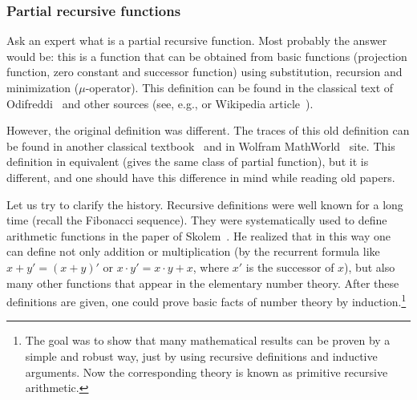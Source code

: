 \documentclass[12pt]{article}
\theoremstyle{remark}
\begin{document}
\subsubsection*{Partial recursive functions}

Ask an expert what is a partial recursive function. Most probably the answer would be: this is a function that can be obtained from basic functions (projection function, zero constant and successor function) using substitution, recursion and minimization ($\mu$-operator). This definition can be found in the classical text of Odifreddi~\cite[p.~127]{Odifreddi1989} and other sources (see, e.g., \cite{Malcev1965,Cutland1980} or Wikipedia article~\cite{Wiki2018}).

However, the original definition was different. The traces of this old definition can be found in another classical textbook~\cite[Section 1.5]{Rogers1972} and in Wolfram MathWorld~\cite{Wolfram2018} site. This definition in equivalent (gives the same class of partial function), but it is different, and one should have this difference in mind while reading old papers.

Let us try to clarify the history. Recursive definitions were well known for a long time (recall the Fibonacci sequence). They were systematically used to define arithmetic functions in the paper of Skolem~\cite{Skolem1923}. He realized that in this way one can define not only addition or multiplication (by the recurrent formula like $x+y' = (x+y)'$ or $x\cdot y' = x\cdot y + x$, where $x'$ is the successor of $x$), but also many other functions that appear in the elementary number theory. After these definitions are given, one could prove basic facts of number theory by induction.\footnote{The goal was to show that many mathematical results can be proven by a simple and robust way, just by using recursive definitions and inductive arguments. Now the corresponding theory is known as primitive recursive arithmetic.}
\end{document}
